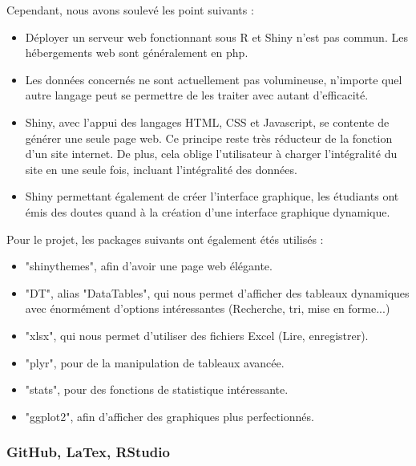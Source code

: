 Cependant, nous avons soulevé les point suivants :

\begin{itemize} 
	\item Déployer un serveur web fonctionnant sous R et Shiny n'est pas commun. Les hébergements web sont généralement en php.
	\item Les données concernés ne sont actuellement pas volumineuse, n'importe quel autre langage peut se permettre de les traiter avec autant d'efficacité.
	\item Shiny, avec l'appui des langages HTML, CSS et Javascript, se contente de générer une seule page web. Ce principe reste très réducteur de la fonction d'un site internet. De plus, cela oblige l'utilisateur à charger l'intégralité du site en une seule fois, incluant l'intégralité des données.
	\item Shiny permettant également de créer l'interface graphique, les étudiants ont émis des doutes quand à la création d'une interface graphique dynamique.
\end{itemize}

Pour le projet, les packages suivants ont également étés utilisés :

\begin{itemize} 
	\item "shinythemes", afin d'avoir une page web élégante.
	\item "DT", alias "DataTables", qui nous permet d'afficher des tableaux dynamiques avec énormément d'options intéressantes (Recherche, tri, mise en forme...)
	\item "xlsx", qui nous permet d'utiliser des fichiers Excel (Lire, enregistrer).
	\item "plyr", pour de la manipulation de tableaux avancée.
	\item "stats", pour des fonctions de statistique intéressante.
	\item "ggplot2", afin d'afficher des graphiques plus perfectionnés.
\end{itemize}

\newpage
\subsubsection {GitHub, LaTex, RStudio}

